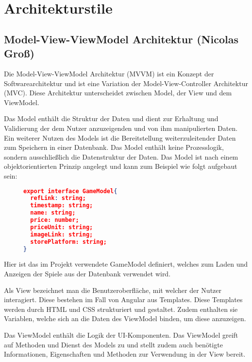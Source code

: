 
\section{Architekturstile}

\subsection*{Model-View-ViewModel Architektur (Nicolas Groß)}

Die Model-View-ViewModel Architektur (MVVM) ist ein Konzept der Softwarearchitektur und ist eine Variation der Model-View-Controller Architektur (MVC). Diese Architektur unterscheidet zwischen Model, der View und dem ViewModel.

Das Model enthält die Struktur der Daten und dient zur Erhaltung und Validierung der dem Nutzer anzuzeigenden und von ihm manipulierten Daten. Ein weiterer Nutzen des Models ist die Bereitstellung weiterzuleitender Daten zum Speichern in einer Datenbank. Das Model enthält keine Prozesslogik, sondern ausschließlich die Datenstruktur der Daten. Das Model ist nach einem objektorientierten Prinzip angelegt und kann zum Beispiel wie folgt aufgebaut sein:

\begin{figure}[bht]
\begin{lstlisting}[caption=Codeausschnitt des GameModel Interfaces,language=json]
export interface GameModel{
  refLink: string;
  timestamp: string;
  name: string;
  price: number;
  priceUnit: string;
  imageLink: string;
  storePlatform: string;
}
\end{lstlisting}
\end{figure}

Hier ist das im Projekt verwendete GameModel definiert, welches zum Laden und Anzeigen der Spiele aus der Datenbank verwendet wird.

Als View bezeichnet man die Benutzeroberfläche, mit welcher der Nutzer interagiert. Diese bestehen im Fall von Angular aus Templates. Diese Templates werden durch HTML und CSS strukturiert und gestaltet. Zudem enthalten sie Variablen, welche sich an die Daten des ViewModel binden, um diese anzuzeigen.

Das ViewModel enthält die Logik der UI-Komponenten. Das ViewModel greift auf Methoden und Dienst des Models zu und stellt zudem auch benötigte Informationen, Eigenschaften und Methoden zur Verwendung in der View bereit.

